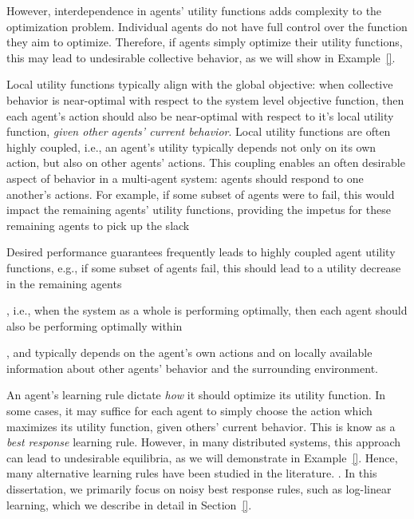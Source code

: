 However, interdependence in agents' utility functions adds complexity to the optimization problem. Individual agents do not have full control over the function they aim to optimize. Therefore, if agents simply optimize their utility functions, this may lead to undesirable collective behavior, as we will show in Example~\ref{}.  



Local utility functions typically align with the global objective: when collective behavior is near-optimal with respect to the system level objective function, then each agent's  action should also be near-optimal with respect to it's local utility function, {\it given other agents' current behavior}. Local utility functions are often highly coupled, i.e., an agent's utility typically depends not only on its own action, but also on other agents' actions. This coupling enables an often desirable aspect of behavior in a multi-agent system: agents should respond to one another's actions. For example, if some subset of agents were to fail, this would impact the remaining agents' utility functions, providing the impetus for these remaining agents to pick up the slack


Desired performance guarantees frequently leads to highly coupled agent utility functions, e.g., if some subset of agents fail, this should lead to a utility decrease in the remaining agents



, i.e., when the system as a whole is performing optimally, then each agent should also be performing optimally within


, and typically depends on the agent's own actions and on locally available information about other agents' behavior and the surrounding environment. 



 An agent's learning rule dictate {\it how} it should optimize its utility function. In some cases, it may suffice for each agent to simply choose the action which maximizes its utility function, given others' current behavior. This is know as a {\it best response} learning rule. However, in many distributed systems, this approach can lead to undesirable equilibria, as we will demonstrate in Example~\ref{}. Hence, many alternative learning rules have been studied in the literature. . In this dissertation, we primarily focus on noisy best response rules, such as log-linear learning, which we describe in detail in Section~\ref{}.

